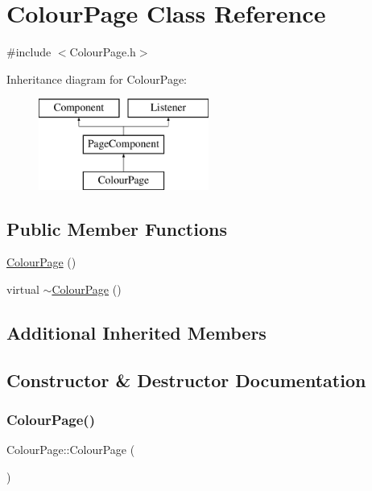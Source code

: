\hypertarget{classColourPage}{}\section{Colour\+Page Class Reference}
\label{classColourPage}


{\ttfamily \#include $<$Colour\+Page.\+h$>$}

Inheritance diagram for Colour\+Page\+:\begin{figure}[H]
\begin{center}
\leavevmode
\includegraphics[height=3.000000cm]{classColourPage}
\end{center}
\end{figure}
\subsection*{Public Member Functions}
\begin{DoxyCompactItemize}
\item 
\mbox{\hyperlink{classColourPage_a690604457ed68537339a676e7eb72225}{Colour\+Page}} ()
\item 
virtual \mbox{\hyperlink{classColourPage_a4eea2a102fcc7268fdf77cb8061cf1dc}{$\sim$\+Colour\+Page}} ()
\end{DoxyCompactItemize}
\subsection*{Additional Inherited Members}


\subsection{Constructor \& Destructor Documentation}
\mbox{\label{classColourPage_a690604457ed68537339a676e7eb72225}} 
\subsubsection{\texorpdfstring{Colour\+Page()}{ColourPage()}}
{\footnotesize\ttfamily Colour\+Page\+::\+Colour\+Page (\begin{DoxyParamCaption}{ }\end{DoxyParamCaption})}

